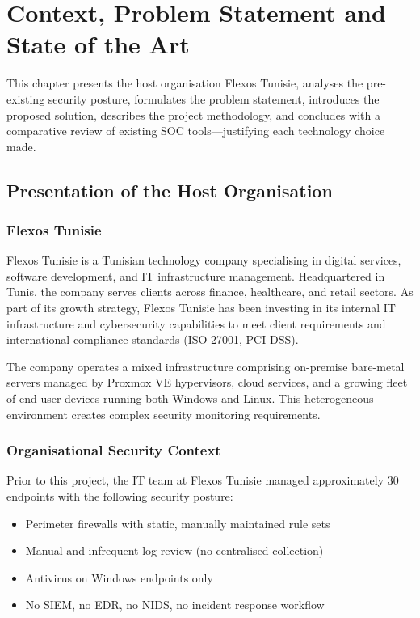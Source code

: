 \documentclass[12pt,a4paper]{report}
\begin{document}
\chapter{Context, Problem Statement and State of the Art}
\minitoc
\vspace{1cm}

This chapter presents the host organisation Flexos Tunisie, analyses the pre-existing security posture, formulates the problem statement, introduces the proposed solution, describes the project methodology, and concludes with a comparative review of existing SOC tools---justifying each technology choice made.

\section{Presentation of the Host Organisation}

\subsection{Flexos Tunisie}

Flexos Tunisie is a Tunisian technology company specialising in digital services, software development, and IT infrastructure management. Headquartered in Tunis, the company serves clients across finance, healthcare, and retail sectors. As part of its growth strategy, Flexos Tunisie has been investing in its internal IT infrastructure and cybersecurity capabilities to meet client requirements and international compliance standards (ISO 27001, PCI-DSS).

The company operates a mixed infrastructure comprising on-premise bare-metal servers managed by Proxmox VE hypervisors, cloud services, and a growing fleet of end-user devices running both Windows and Linux. This heterogeneous environment creates complex security monitoring requirements.

\subsection{Organisational Security Context}

Prior to this project, the IT team at Flexos Tunisie managed approximately 30 endpoints with the following security posture:

\begin{itemize}
  \item Perimeter firewalls with static, manually maintained rule sets
  \item Manual and infrequent log review (no centralised collection)
  \item Antivirus on Windows endpoints only
  \item No SIEM, no EDR, no NIDS, no incident response workflow
\end{itemize}
\end{document}
